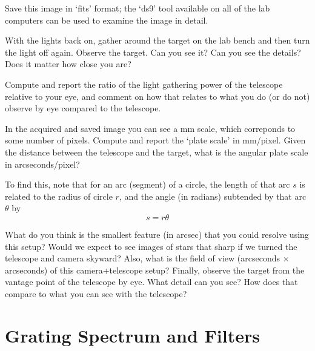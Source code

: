 \begin{steps}
	\item Save this image in ‘fits’ format; the ‘ds9’ tool available on all of the lab
	computers can be used to examine the image in detail.
	
	\item With the lights back on, gather around the target on the lab bench and then
	turn the light off again. Observe the target. Can you see it? Can you see the details? Does
	it matter how close you are?%
	
	\item Compute and report the ratio of the light gathering power of
	the telescope relative to your eye, and comment on how that relates to what you do (or do
	not) observe by eye compared to the telescope.%
	
	\item In the acquired and saved image you can see a mm scale, which correponds to some number
	of pixels. Compute and report the ‘plate scale’ in mm/pixel. Given the distance between the
	telescope and the target, what is the angular plate scale in arcseconds/pixel?
	
	To find this, note that for an arc (segment) of a circle, the length of that arc $s$ is related to the radius of circle $r$, and the angle (in radians) subtended by that arc $\theta$ by
	\begin{equation}
	 s = r \theta
	\end{equation}
	
	\item What do you
	think is the smallest feature (in arcsec) that you could resolve using this setup? Would we
	expect to see images of stars that sharp if we turned the telescope and camera skyward?
	Also, what is the field of view (arcseconds $\times$
	arcseconds) of this camera+telescope setup? Finally, observe the target from the vantage
	point of the telescope by eye. What detail can you see? How does that compare to what
	you can see with the telescope?
\end{steps}

\section{Grating Spectrum and Filters}\label{sot:sec:grating}

